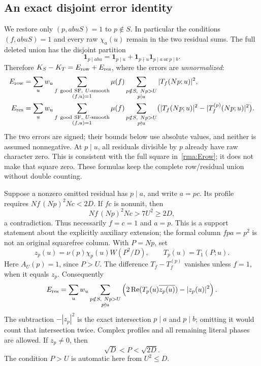 \documentclass[11pt]{article}
\theoremstyle{definition}\newtheorem{definition}[theorem]{Definition}
\theoremstyle{remark}\newtheorem{remark}[theorem]{Remark}
\begin{document}
\subsection{An exact disjoint error identity}
We restore only $(p,abuS)=1$ to $p\notin S$. In particular the conditions
$(f,abuS)=1$ and every raw $\chi_a(u)$ remain in the two residual sums.
The full deleted union has the disjoint partition
\begin{equation}\label{rma:union}
 \mathbf1_{p\mid abu}=\mathbf1_{p\mid u}
       +\mathbf1_{p\nmid u}\mathbf1_{p\mid a\ \mathrm{or}\ p\mid b}.
\end{equation}
Therefore $K_S-K_T=E_{\rm row}+E_{\rm res}$, where the errors are
\emph{unnormalized}:
\begin{align}
 E_{\rm row}
 &=\sum_u w_u\sum_{\substack{f\ \mathrm{good\ SF},\ U\text{-smooth}\\
                            (f,u)=1}}\mu(f)
        \sum_{\substack{p\notin S,\ Np>U\\p\mid u}}
                  |T_f(Np;u)|^2,\label{rma:Erow}\\
 E_{\rm res}
 &=\sum_u w_u\sum_{\substack{f\ \mathrm{good\ SF},\ U\text{-smooth}\\
                            (f,u)=1}}\mu(f)
        \sum_{\substack{p\notin S,\ Np>U\\p\nmid u}}
       \bigl(|T_f(Np;u)|^2-|T_f^{(p)}(Np;u)|^2\bigr).
       \label{rma:Eres}
\end{align}
The two errors are signed; their bounds below use absolute values,
and neither is assumed nonnegative.
At $p\mid u$, all residuals divisible by $p$ already have raw character
zero. This is consistent with the full square in~\eqref{rma:Erow}; it
does not make that square zero. These formulas keep the complete
row/residual union without double counting.

Suppose a nonzero omitted residual has $p\mid a$, and write $a=pc$.
Its profile requires $Nf\,(Np)^2Nc<2D$. If $fc$ is nonunit, then
\[
 Nf\,(Np)^2Nc>7U^2\ge2D,
\]
a contradiction. Thus necessarily $f=c=1$ and $a=p$. This is a support
statement about the explicitly auxiliary extension; the formal column
$fpa=p^2$ is not an original squarefree column. With $P=Np$, set
\begin{equation}\label{rma:z}
 z_p(u)=\nu(p)\chi_p(u)W(P^2/D),\qquad T_p(u)=T_1(P;u).
\end{equation}
Here $A_U(p)=1$, since $P>U$. The difference $T_f-T_f^{(p)}$ vanishes
unless $f=1$, when it equals $z_p$. Consequently
\begin{equation}\label{rma:res-exact}
 E_{\rm res}=\sum_u w_u
       \sum_{\substack{p\notin S,\ Np>U\\p\nmid u}}
       \left(2\operatorname{Re}(T_p(u)\overline{z_p(u)})
                         -|z_p(u)|^2\right).
\end{equation}
The subtraction $-|z_p|^2$ is the exact intersection
$p\mid a$ and $p\mid b$; omitting it would count that intersection
twice. Complex profiles and all remaining literal phases are allowed.
If $z_p\ne0$, then
\begin{equation}\label{rma:zsupport}
 \sqrt D<P<\sqrt{2D}.
\end{equation}
The condition $P>U$ is automatic here from $U^2\le D$.
\end{document}
